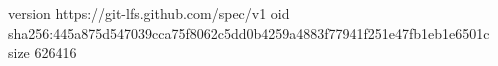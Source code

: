 version https://git-lfs.github.com/spec/v1
oid sha256:445a875d547039cca75f8062c5dd0b4259a4883f77941f251e47fb1eb1e6501c
size 626416
